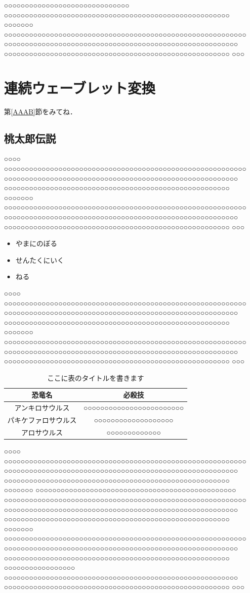 ○○○○○○○○○○○○○○○○○○○○○○○○○○○○○○ ○○○○○○○○○○○○○○○○○○○○○○○○○○○○○○○○○○○○○○○○○○○○○○○○○○○○○○ ○○○○○○○ ○○○○○○○○○○○○○○○○○○○○○○○○○○○○○○○○○○○○○○○○○○○○○○○○○○○○○○○○○○ ○○○○○○○○○○○○○○○○○○○○○○○○○○○○○○○○○○○○○○○○○○○○○○○○○○○○○○○○ ○○○○○○○○○○○○○○○○○○○○○○○○○○○○○○○○○○○○○○○○○○○○○○○○○○○○○○ ○○○
\section{連続ウェーブレット変換}

第\ref{AAAB}節をみてね．

\subsection{桃太郎伝説}
○○○○ ○○○○○○○○○○○○○○○○○○○○○○○○○○○○○○○○○○○○○○○○○○○○○○○○○○○○○○○○○○ ○○○○○○○○○○○○○○○○○○○○○○○○○○○○○○○○○○○○○○○○○○○○○○○○○○○○○○○○ ○○○○○○○○○○○○○○○○○○○○○○○○○○○○○○○○○○○○○○○○○○○○○○○○○○○○○○ ○○○○○○○ ○○○○○○○○○○○○○○○○○○○○○○○○○○○○○○○○○○○○○○○○○○○○○○○○○○○○○○○○○○ ○○○○○○○○○○○○○○○○○○○○○○○○○○○○○○○○○○○○○○○○○○○○○○○○○○○○○○○○ ○○○○○○○○○○○○○○○○○○○○○○○○○○○○○○○○○○○○○○○○○○○○○○○○○○○○○○ ○○○

\begin{itemize}
\item やまにのぼる
\item せんたくにいく
\item ねる
\end{itemize}

○○○○ ○○○○○○○○○○○○○○○○○○○○○○○○○○○○○○○○○○○○○○○○○○○○○○○○○○○○○○○○○○ ○○○○○○○○○○○○○○○○○○○○○○○○○○○○○○○○○○○○○○○○○○○○○○○○○○○○○○○○ ○○○○○○○○○○○○○○○○○○○○○○○○○○○○○○○○○○○○○○○○○○○○○○○○○○○○○○ ○○○○○○○ ○○○○○○○○○○○○○○○○○○○○○○○○○○○○○○○○○○○○○○○○○○○○○○○○○○○○○○○○○○ ○○○○○○○○○○○○○○○○○○○○○○○○○○○○○○○○○○○○○○○○○○○○○○○○○○○○○○○○ ○○○○○○○○○○○○○○○○○○○○○○○○○○○○○○○○○○○○○○○○○○○○○○○○○○○○○○ ○○○

\begin{table}
\begin{center}
\caption{ここに表のタイトルを書きます}\label{AAA}
\begin{tabular}{cc}
\hline
恐竜名 & 必殺技 \\
\hline
アンキロサウルス & ○○○○○○○○○○○○○○○○○○○○○○○○  \\
パキケファロサウルス & ○○○○○○○○○○○○○○○○○○○  \\
アロサウルス & ○○○○○○○○○○○○○  \\
\hline
\end{tabular}
\end{center}
\end{table}
○○○○ ○○○○○○○○○○○○○○○○○○○○○○○○○○○○○○○○○○○○○○○○○○○○○○○○○○○○○○○○○○ ○○○○○○○○○○○○○○○○○○○○○○○○○○○○○○○○○○○○○○○○○○○○○○○○○○○○○○○○ ○○○○○○○○○○○○○○○○○○○○○○○○○○○○○○○○○○○○○○○○○○○○○○○○○○○○○○ ○○○○○○○ ○○○○○○○○○○○○○○○○○○○○○○○○○○○○○○○○○○○○○○○○○○○○○○○○ ○○○○○○○○○○○○○○○○○○○○○○○○○○○○○○○○○○○○○○○○○○○○○○○○○○○○○○○○○○ ○○○○○○○○○○○○○○○○○○○○○○○○○○○○○○○○○○○○○○○○○○○○○○○○○○○○○○○○ ○○○○○○○○○○○○○○○○○○○○○○○○○○○○○○○○○○○○○○○○○○○○○○○○○○○○○○ ○○○○○○○ ○○○○○○○○○○○○○○○○○○○○○○○○○○○○○○○○○○○○○○○○○○○○○○○○○○○○○○○○○○ ○○○○○○○○○○○○○○○○○○○○○○○○○○○○○○○○○○○○○○○○○○○○○○○○○○○○○○○○ ○○○○○○○○○○○○○○○○○○○○○○○○○○○○○○○○○○○○○○○○○○○○○○○○○○○○○○ ○○○○○○○○○○○○○○○○○ ○○○○○○○○○○○○○○○○○○○○○○○○○○○○○○○○○○○○○○○○○○○○○○○○○○○○○○○○ ○○○○○○○○○○○○○○○○○○○○○○○○○○○○○○○○○○○○○○○○○○○○○○○○○○○○○○ ○○○

